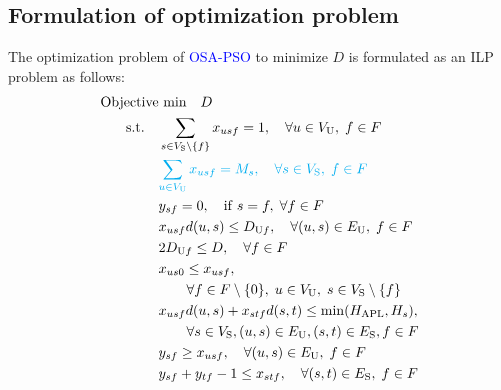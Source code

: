 \documentclass[10pt, letterpaper]{IEEEtran}
\newcommand\blue[1]{\textcolor{blue}{#1}}
\newcommand\cyan[1]{\textcolor{cyan}{#1}}
\begin{document}
\begin{CJK}{UTF8}{ipxm}
\subsection{Formulation of optimization problem}
The optimization problem of \blue{OSA-PSO} to minimize $D$ is formulated as an ILP problem as follows:
\blue{
\begin{subequations} \label{OSA-PSO}
  \begin{align}
  \text{Objective}&\text{ min}\quad D \label{OSA-PSO a} \\
  \rm{s.t.} \quad
  &\sum_{s \in V_{\rm{S}} \setminus \{f\}} x_{usf} = 1, \quad \forall u \in V_{\rm{U}}, \; f \in F \label{OSA-PSO b} \\
  &\cyan{\sum_{u \in V_{\rm{U}}} x_{usf} = M_s, \quad \forall s \in V_{\rm{S}}, \; f \in F} \label{OSA-PSO b'} \\  %
  &y_{sf} = 0, \quad \mathrm{if} \; s = f, \; \forall f \in F \label{OSA-PSO c} \\  %
  &x_{usf}d(u,s) \le D_{\mathrm{U}f}, \quad \forall (u,s) \in E_{\rm{U}}, \; f \in F \label{OSA-PSO d} \\
  &2D_{\mathrm{U}f} \le D, \quad \forall f \in F \label{OSA-PSO e} \\
  &x_{us0} \le x_{usf}, \notag \\
  &\qquad \forall f \in F \setminus \{0\}, \; u \in V_{\rm{U}}, \; s \in V_{\rm{S}} \setminus \{f\} \label{OSA-PSO f} \\
  &x_{usf}d(u,s) + x_{stf}d(s,t) \le \min(H_{\rm APL},H_s), \notag \\
  &\qquad \forall s \in V_{\rm{S}}, (u,s) \in E_{\rm{U}}, (s,t) \in E_{\rm{S}}, f \in F \label{OSA-PSO g} \\
  &y_{sf} \geq x_{usf}, \quad \forall (u,s) \in E_{\rm{U}}, \; f \in F \label{OSA-PSO h} \\
  &y_{sf} + y_{tf} - 1 \le x_{stf}, \quad \forall (s,t) \in E_{\rm{S}}, \; f \in F \label{OSA-PSO i} \\

\end{align}
\end{subequations}}
\end{CJK}
\end{document}
